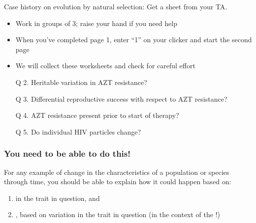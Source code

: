 \begin{frame}
    Case history on evolution by natural selection: Get a sheet from your TA.

    \begin{itemize}
        \item Work in groups of 3; raise your hand if you need help

        \item When you've completed page 1, enter ``1'' on your clicker and
            start the second page

        \item We will collect these worksheets and check for careful effort
    \end{itemize}
\end{frame}

\begin{frame}
    \begin{enumerate}%

        \item[Q 2.] Heritable variation in AZT resistance?
        
        \vspace{1cm}
        \item[Q 3.] Differential reproductive success with respect to AZT resistance?

        \vspace{1cm}
        \item[Q 4.] AZT resistance present prior to start of therapy?

        \vspace{1cm}
        \item[Q 5.] Do individual HIV particles change?
    \end{enumerate}
\end{frame}

\begin{frame}
    \frametitle{You need to be able to do this!}

    For any example of change in the characteristics of a population or species
    through time, you should be able to explain how it could happen based on: 

    \begin{enumerate}
        \item<2->  in the trait in question, and 

        \item<3-> , based on
            variation in the trait in question (in the context of the
            !)
    \end{enumerate}
\end{frame}

